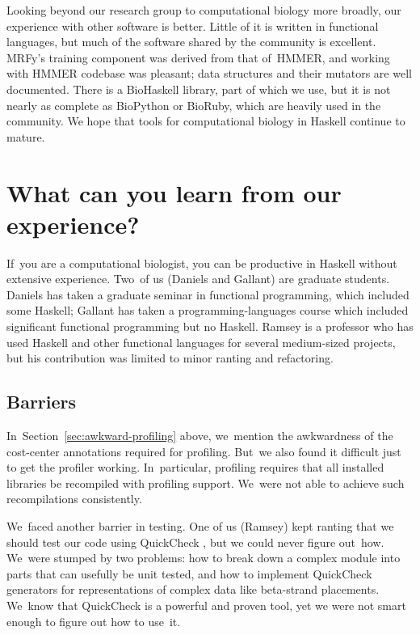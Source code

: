 \documentclass[preprint,nonatbib,blockstyle,nocopyrightspace,times]{sigplanconf}
\newcommand\secref[1]{Section~\ref{sec:#1}}
\let\cite\citep
\begin{document}
Looking beyond our research group to computational biology more
broadly, our experience with other software is better.
Little of it is written in functional languages, 
but much of the software shared by the community is excellent.
MRFy's training component was derived from that of~HMMER,
and
working with HMMER 
codebase was pleasant;
data structures and their
mutators are well documented. 
There is a 
BioHaskell library, part of which we use,
but it is not nearly as 
complete as BioPython or BioRuby, which are heavily used in the community.
We hope that tools for computational biology in
Haskell continue to mature. 

\section{What can you learn from our experience?}

If~you are a computational biologist, 
you can be productive in Haskell without extensive
experience.
Two~of us (Daniels and Gallant) are graduate students.
Daniels has taken a graduate seminar in functional programming, which
included some Haskell;
Gallant has taken a programming-languages course which included
significant functional programming but no Haskell.
Ramsey is a professor who has used Haskell and other functional
languages for several medium-sized projects,
but his contribution was limited to minor ranting and refactoring.


\subsection{Barriers}

In~\secref{awkward-profiling} above, we~mention the awkwardness of the
cost-center annotations required for profiling.
But~we also found it difficult just to get the profiler working.
In~particular, profiling requires that all installed libraries be recompiled
with profiling support.
We~were not able to achieve such recompilations consistently.


We~faced another barrier in testing.
One of us (Ramsey) kept ranting that we should test our code using 
QuickCheck \cite{claessen:quickcheck},
but we could never figure out~how.
We~were stumped by two problems:
how to break down a complex module into parts that can usefully be
unit tested,
and how to implement QuickCheck generators for representations of complex
data like beta-strand placements.
We~know that QuickCheck is a powerful and proven tool,
yet we were not smart enough to figure out how to use~it.
\end{document}
